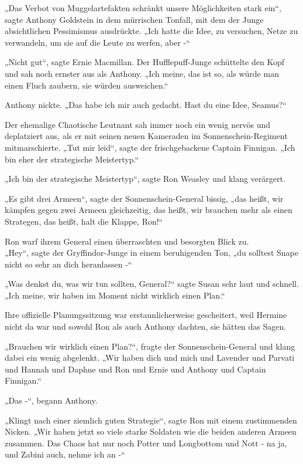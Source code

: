 {„Das Verbot von Muggelartefakten schränkt unsere Möglichkeiten stark ein“, sagte Anthony Goldstein in dem mürrischen Tonfall, mit dem der Junge absichtlichen Pessimismus ausdrückte. „Ich hatte die Idee, zu versuchen, Netze zu verwandeln, um sie auf die Leute zu werfen, aber -“

„Nicht gut“, sagte Ernie Macmillan. Der Hufflepuff-Junge schüttelte den Kopf und sah noch ernster aus als Anthony. „Ich meine, das ist so, als würde man einen Fluch zaubern, sie würden ausweichen.“

Anthony nickte. „Das habe ich mir auch gedacht. Hast du eine Idee, Seamus?“

Der ehemalige Chaotische Leutnant sah immer noch ein wenig nervös und deplatziert aus, als er mit seinen neuen Kameraden im Sonnenschein-Regiment mitmarschierte. „Tut mir leid“, sagte der frischgebackene Captain Finnigan. „Ich bin eher der strategische Meistertyp.“

„Ich bin der strategische Meistertyp“, sagte Ron Weasley und klang verärgert.

„Es gibt drei Armeen“, sagte der Sonnenschein-General bissig, „das heißt, wir kämpfen gegen zwei Armeen gleichzeitig, das heißt, wir brauchen mehr als einen Strategen, das heißt, halt die Klappe, Ron!“

Ron warf ihrem General einen überraschten und besorgten Blick zu.\\ „Hey“, sagte der Gryffindor-Junge in einem beruhigenden Ton, „du solltest Snape nicht so sehr an dich heranlassen -“

„Was denkst du, was wir tun sollten, General?“ sagte Susan sehr laut und schnell. „Ich meine, wir haben im Moment nicht wirklich einen Plan.“

Ihre offizielle Planungssitzung war erstaunlicherweise gescheitert, weil Hermine nicht da war und sowohl Ron als auch Anthony dachten, sie hätten das Sagen.

„Brauchen wir wirklich einen Plan?“, fragte der Sonnenschein-General und klang dabei ein wenig abgelenkt. „Wir haben dich und mich und Lavender und Parvati und Hannah und Daphne und Ron und Ernie und Anthony und Captain Finnigan.“

„Das -“, begann Anthony.

„Klingt nach einer ziemlich guten Strategie“, sagte Ron mit einem zustimmenden Nicken. „Wir haben jetzt so viele starke Soldaten wie die beiden anderen Armeen zusammen. Das Chaos hat nur noch Potter und Longbottom und Nott - na ja, und Zabini auch, nehme ich an -“

}
